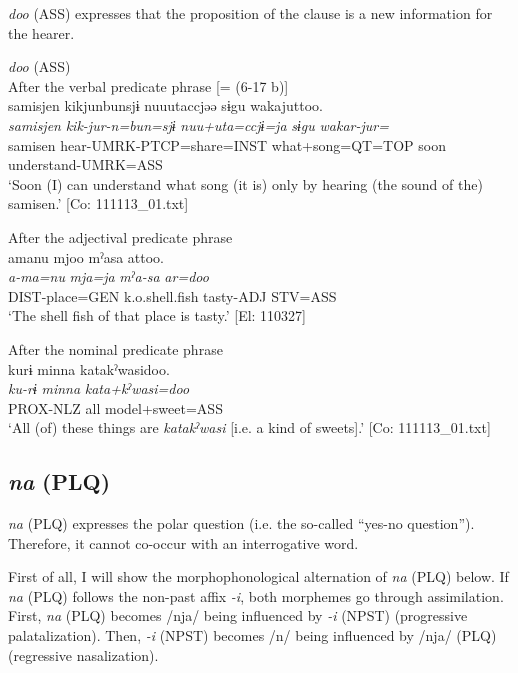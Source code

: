 \textit{doo} (ASS) expresses that the proposition of the clause is a new information for the hearer.

\ea\label{ex:10.40}   \textit{doo} (ASS)\\
  \ea After the verbal predicate phrase [= (6-17 b)]\\
      \glll    samisjen  kikjunbunsjɨ  nuuutaccjəə  sɨgu  wakajuttoo.\\
    \textit{samisjen}  \textit{kik-jur-n=bun=sjɨ}  \textit{nuu+uta=ccjɨ=ja}  \textit{sɨgu}  \textit{wakar-jur=}\\
    samisen  hear-UMRK-PTCP=share=INST  what+song=QT=TOP  soon  understand-UMRK=ASS\\
\glt     ‘Soon (I) can understand what song (it is) only by hearing (the sound of the) samisen.’  [Co: 111113\_01.txt]

  \ex After the adjectival predicate phrase\\
      \glll    amanu  mjoo  mˀasa  attoo.\\
    \textit{a-ma=nu}  \textit{mja=ja}  \textit{mˀa-sa}  \textit{ar=doo}\\
    DIST-place=GEN  k.o.shell.fish  tasty-ADJ  STV=ASS\\
    \glt     ‘The shell fish of that place is tasty.’ [El: 110327]

  \ex  After the nominal predicate phrase\\
      \glll    kurɨ  minna  katakˀwasidoo.\\
    \textit{ku-rɨ}  \textit{minna}  \textit{kata+kˀwasi=doo}\\
    PROX-NLZ  all  model+sweet=ASS\\
\glt     ‘All (of) these things are \textit{katakˀwasi} [i.e. a kind of sweets].’  [Co: 111113\_01.txt]
    \z
\z

\subsection{\textit{na} (PLQ)}\label{sec:10.3.2}

\textit{na} (PLQ) expresses the polar question (i.e. the so-called “yes-no question”). Therefore, it cannot co-occur with an interrogative word.

First of all, I will show the morphophonological alternation of \textit{na} (PLQ) below. If \textit{na} (PLQ) follows the non-past affix \textit{{}-i}, both morphemes go through assimilation. First, \textit{na} (PLQ) becomes /nja/ being influenced by \textit{{}-i} (NPST) (progressive palatalization). Then, \textit{{}-i} (NPST) becomes /n/ being influenced by /nja/ (PLQ) (regressive nasalization).

